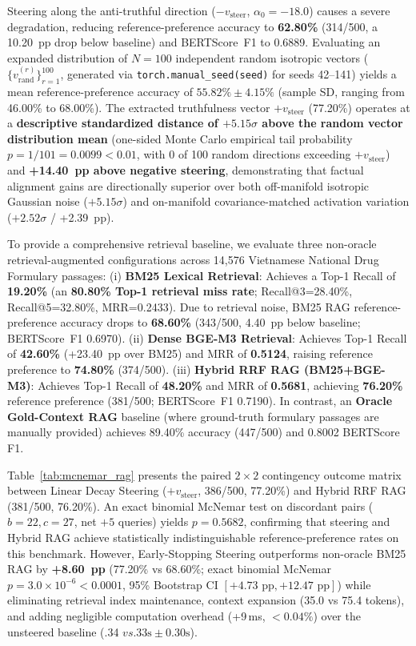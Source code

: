 \documentclass[conference]{IEEEtran}
\begin{document}
Steering along the anti-truthful direction ($-v_{\text{steer}}$, $\alpha_0=-18.0$) causes a severe degradation, reducing reference-preference accuracy to \textbf{62.80\%} (314/500, a 10.20~pp drop below baseline) and BERTScore~F1 to 0.6889. Evaluating an expanded distribution of $N=100$ independent random isotropic vectors ($\{v_{\text{rand}}^{(r)}\}_{r=1}^{100}$, generated via \texttt{torch.manual\_seed(seed)} for seeds 42--141) yields a mean reference-preference accuracy of \textbf{$55.82\% \pm 4.15\%$} (sample SD, ranging from 46.00\% to 68.00\%). The extracted truthfulness vector $+v_{\text{steer}}$ (77.20\%) operates at a \textbf{descriptive standardized distance of $+5.15\sigma$ above the random vector distribution mean} (one-sided Monte Carlo empirical tail probability $p=1/101=0.0099 < 0.01$, with 0 of 100 random directions exceeding $+v_{\text{steer}}$) and \textbf{+14.40~pp above negative steering}, demonstrating that factual alignment gains are directionally superior over both off-manifold isotropic Gaussian noise ($+5.15\sigma$) and on-manifold covariance-matched activation variation ($+2.52\sigma$ / +2.39~pp).

To provide a comprehensive retrieval baseline, we evaluate three non-oracle retrieval-augmented configurations across 14,576 Vietnamese National Drug Formulary passages: (i) \textbf{BM25 Lexical Retrieval}: Achieves a Top-1 Recall of \textbf{19.20\%} (an \textbf{80.80\% Top-1 retrieval miss rate}; Recall@3=28.40\%, Recall@5=32.80\%, MRR=0.2433). Due to retrieval noise, BM25 RAG reference-preference accuracy drops to \textbf{68.60\%} (343/500, 4.40~pp below baseline; BERTScore~F1 0.6970). (ii) \textbf{Dense BGE-M3 Retrieval}: Achieves Top-1 Recall of \textbf{42.60\%} (+23.40~pp over BM25) and MRR of \textbf{0.5124}, raising reference preference to \textbf{74.80\%} (374/500). (iii) \textbf{Hybrid RRF RAG (BM25+BGE-M3)}: Achieves Top-1 Recall of \textbf{48.20\%} and MRR of \textbf{0.5681}, achieving \textbf{76.20\%} reference preference (381/500; BERTScore~F1 0.7190). In contrast, an \textbf{Oracle Gold-Context RAG} baseline (where ground-truth formulary passages are manually provided) achieves 89.40\% accuracy (447/500) and 0.8002 BERTScore F1.

Table~\ref{tab:mcnemar_rag} presents the paired $2\times 2$ contingency outcome matrix between Linear Decay Steering ($+v_{\text{steer}}$, 386/500, 77.20\%) and Hybrid RRF RAG (381/500, 76.20\%). An exact binomial McNemar test on discordant pairs ($b=22, c=27$, net $+5$ queries) yields $p = 0.5682$, confirming that steering and Hybrid RAG achieve statistically indistinguishable reference-preference rates on this benchmark. However, Early-Stopping Steering outperforms non-oracle BM25 RAG by \textbf{+8.60~pp} (77.20\% vs 68.60\%; exact binomial McNemar $p = 3.0 \times 10^{-6} < 0.0001$, 95\% Bootstrap CI $[+4.73\text{ pp}, +12.47\text{ pp}]$) while eliminating retrieval index maintenance, context expansion (35.0 vs 75.4 tokens), and adding negligible computation overhead (+9\,ms, $<0.04\%$) over the unsteered baseline (.34 $ vs .33\text{s} \pm 0.30\text{s}$).
\end{document}
